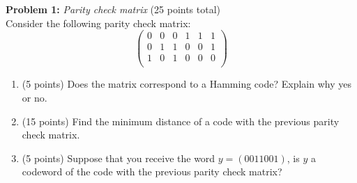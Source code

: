 \noindent \textbf{Problem 1:} \emph{Parity check matrix} (25 points total)\\
Consider the following parity check matrix:
\begin{equation*}
\begin{pmatrix}
0 & 0 & 0 & 1 & 1 & 1\\
0 & 1 & 1 & 0 & 0 & 1\\
1 & 0 & 1 & 0 & 0 & 0\\
\end{pmatrix}
\end{equation*}

\begin{enumerate}
\item (5 points) Does the matrix correspond to a Hamming code? Explain why yes or no.

\noindent{}

\item (15 points) Find the minimum distance of a code with the previous parity check matrix.

\noindent {}

\item (5 points) Suppose that you receive the word $y=(0011001)$, is $y$ a codeword of the code with the previous parity check matrix?

\noindent{}

\end{enumerate}

